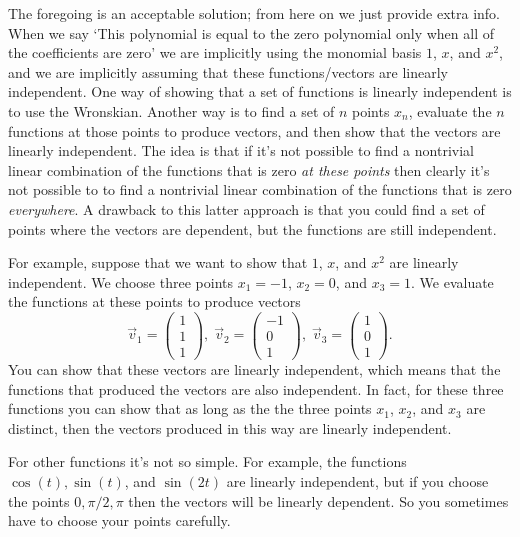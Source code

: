 \documentclass[11pt,fleqn]{article}
\begin{document}
\begin{enumerate}
The foregoing is an acceptable solution; from here on we just provide extra info.
When we say `This polynomial is equal to the zero polynomial only when all of the coefficients are zero' we are implicitly using the monomial basis $1$, $x$, and $x^2$, and we are implicitly assuming that these functions/vectors are linearly independent.
One way of showing that a set of functions is linearly independent is to use the Wronskian.
Another way is to find a set of $n$ points $x_n$, evaluate the $n$ functions at those points to produce vectors, and then show that the vectors are linearly independent.
The idea is that if it's not possible to find a nontrivial linear combination of the functions that is zero {\it at these points} then clearly it's not possible to to find a nontrivial linear combination of the functions that is zero {\it everywhere}.
A drawback to this latter approach is that you could find a set of points where the vectors are dependent, but the functions are still independent.

For example, suppose that we want to show that $1$, $x$, and $x^2$ are linearly independent.
We choose three points $x_1 = -1$, $x_2 = 0$, and $x_3 = 1$.
We evaluate the functions at these points to produce vectors
\[\vec{v}_1 = \left(\begin{array}{c}1\\1\\1\end{array}\right),\;\vec{v}_2 = \left(\begin{array}{c}-1\\0\\1\end{array}\right),\;\vec{v}_3 = \left(\begin{array}{c}1\\0\\1\end{array}\right).\]
You can show that these vectors are linearly independent, which means that the functions that produced the vectors are also independent.
In fact, for these three functions you can show that as long as the the three points $x_1$, $x_2$, and $x_3$ are distinct, then the vectors produced in this way are linearly independent.

For other functions it's not so simple. For example, the functions $\cos(t), \sin(t)$, and $\sin(2t)$ are linearly independent, but if you choose the points $0,\pi/2,\pi$ then the vectors will be linearly dependent.
So you sometimes have to choose your points carefully.


\end{enumerate}
\end{document}
